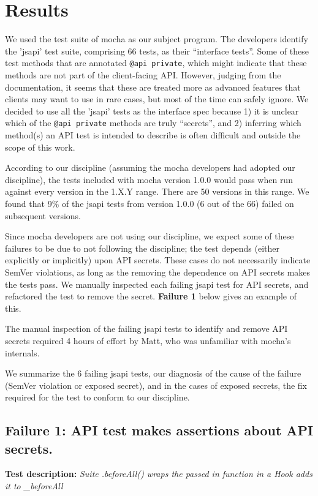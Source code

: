 \section{Results}
We used the test suite of mocha as our subject program. The developers
identify the 'jsapi' test suite, comprising 66 tests, as their
``interface tests''. Some of these test methods that are annotated
{\tt @api private}, which might indicate that these methods are not
part of the client-facing API. However, judging from the
documentation, it seems that these are treated more as advanced
features that clients may want to use in rare cases, but most of the
time can safely ignore. We decided to use all the 'jsapi' tests as the
interface spec because 1) it is unclear which of the {\tt @api
  private} methods are truly ``secrets'', and 2) inferring which
method(s) an API test is intended to describe is often difficult and
outside the scope of this work.

According to our discipline (assuming the mocha developers had adopted
our discipline), the tests included with mocha version 1.0.0 would
pass when run against every version in the 1.X.Y range. There are 50
versions in this range. We found that 9\% of the jsapi tests from
version 1.0.0 (6 out of the 66) failed on subsequent versions.

Since mocha developers are not using our discipline, we expect some of
these failures to be due to not following the discipline; the test
depends (either explicitly or implicitly) upon API secrets. These
cases do not necessarily indicate SemVer violations, as long as the
removing the dependence on API secrets makes the tests pass. We
manually inspected each failing jsapi test for API secrets, and
refactored the test to remove the secret. {\bf Failure 1} below gives
an example of this.

The manual inspection of the failing jsapi tests to identify and
remove API secrets required 4 hours of effort by Matt, who was
unfamiliar with mocha's internals.

We summarize the 6 failing jsapi tests, our diagnosis of the cause of
the failure (SemVer violation or exposed secret), and in the cases of
exposed secrets, the fix required for the test to conform to our
discipline.

\subsection{Failure 1: API test makes assertions about API secrets.}
{\bf Test description: } {\em Suite .beforeAll() wraps the passed in
function in a Hook adds it to \_beforeAll}

